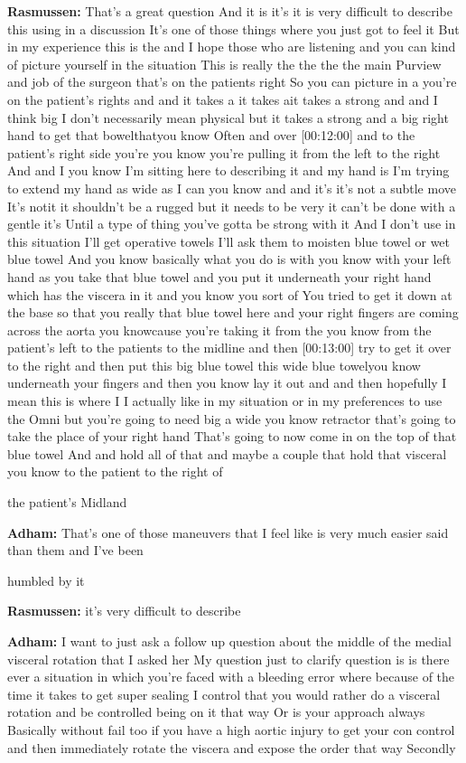 \documentclass[
]{book}
\begin{document}
\textbf{Rasmussen:} That's a great question And it is it's it is very
difficult to describe this using in a discussion It's one of those
things where you just got to feel it But in my experience this is the
and I hope those who are listening and you can kind of picture yourself
in the situation This is really the the the the main Purview and job of
the surgeon that's on the patients right So you can picture in a you're
on the patient's rights and and it takes a it takes ait takes a strong
and and I think big I don't necessarily mean physical but it takes a
strong and a big right hand to get that bowelthatyou know Often and over
{[}00:12:00{]} and to the patient's right side you're you know you're
pulling it from the left to the right And and I you know I'm sitting
here to describing it and my hand is I'm trying to extend my hand as
wide as I can you know and and it's it's not a subtle move It's notit it
shouldn't be a rugged but it needs to be very it can't be done with a
gentle it's Until a type of thing you've gotta be strong with it And I
don't use in this situation I'll get operative towels I'll ask them to
moisten blue towel or wet blue towel And you know basically what you do
is with you know with your left hand as you take that blue towel and you
put it underneath your right hand which has the viscera in it and you
know you sort of You tried to get it down at the base so that you really
that blue towel here and your right fingers are coming across the aorta
you knowcause you're taking it from the you know from the patient's left
to the patients to the midline and then {[}00:13:00{]} try to get it over to
the right and then put this big blue towel this wide blue towelyou know
underneath your fingers and then you know lay it out and and then
hopefully I mean this is where I I actually like in my situation or in
my preferences to use the Omni but you're going to need big a wide you
know retractor that's going to take the place of your right hand That's
going to now come in on the top of that blue towel And and hold all of
that and maybe a couple that hold that visceral you know to the patient
to the right of

the patient's Midland

\textbf{Adham:} That's one of those maneuvers that I feel like is very much
easier said than them and I've been

humbled by it

\textbf{Rasmussen:} it's very difficult to describe

\textbf{Adham:} I want to just ask a follow up question about the middle of
the medial visceral rotation that I asked her My question just to
clarify question is is there ever a situation in which you're faced with
a bleeding error where because of the time it takes to get super sealing
I control that you would rather do a visceral rotation and be controlled
being on it that way Or is your approach always Basically without fail
too if you have a high aortic injury to get your con control and then
immediately rotate the viscera and expose the order that way Secondly
\end{document}
